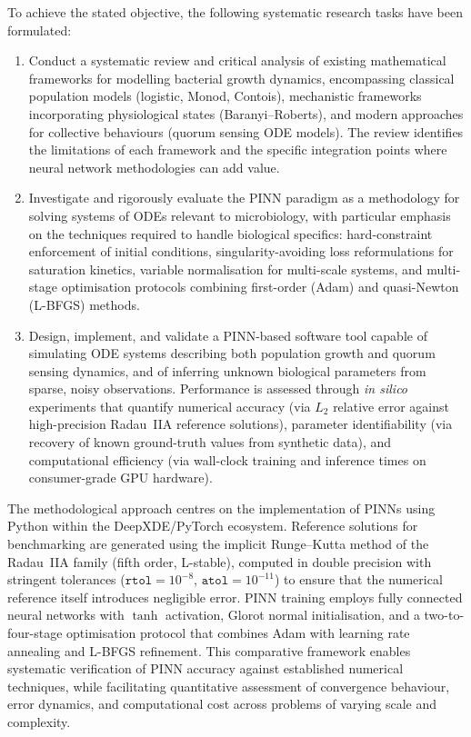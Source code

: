 \documentclass[14pt,a4paper,openany]{extbook}
\begin{document}
To achieve the stated objective, the following systematic research tasks have been formulated:

\begin{enumerate}
    \item Conduct a systematic review and critical analysis of existing mathematical frameworks for modelling bacterial growth dynamics, encompassing classical population models (logistic, Monod, Contois), mechanistic frameworks incorporating physiological states (Baranyi--Roberts), and modern approaches for collective behaviours (quorum sensing ODE models). The review identifies the limitations of each framework and the specific integration points where neural network methodologies can add value.

    \item Investigate and rigorously evaluate the PINN paradigm as a methodology for solving systems of ODEs relevant to microbiology, with particular emphasis on the techniques required to handle biological specifics: hard-constraint enforcement of initial conditions, singularity-avoiding loss reformulations for saturation kinetics, variable normalisation for multi-scale systems, and multi-stage optimisation protocols combining first-order (Adam) and quasi-Newton (L-BFGS) methods.

    \item Design, implement, and validate a PINN-based software tool capable of simulating ODE systems describing both population growth and quorum sensing dynamics, and of inferring unknown biological parameters from sparse, noisy observations. Performance is assessed through \textit{in silico} experiments that quantify numerical accuracy (via $L_2$ relative error against high-precision Radau~IIA reference solutions), parameter identifiability (via recovery of known ground-truth values from synthetic data), and computational efficiency (via wall-clock training and inference times on consumer-grade GPU hardware).
\end{enumerate}

The methodological approach centres on the implementation of PINNs using Python within the DeepXDE/PyTorch ecosystem. Reference solutions for benchmarking are generated using the implicit Runge--Kutta method of the Radau~IIA family (fifth order, L-stable), computed in double precision with stringent tolerances ($\texttt{rtol} = 10^{-8}$, $\texttt{atol} = 10^{-11}$) to ensure that the numerical reference itself introduces negligible error. PINN training employs fully connected neural networks with $\tanh$ activation, Glorot normal initialisation, and a two-to-four-stage optimisation protocol that combines Adam with learning rate annealing and L-BFGS refinement. This comparative framework enables systematic verification of PINN accuracy against established numerical techniques, while facilitating quantitative assessment of convergence behaviour, error dynamics, and computational cost across problems of varying scale and complexity.
\end{document}
